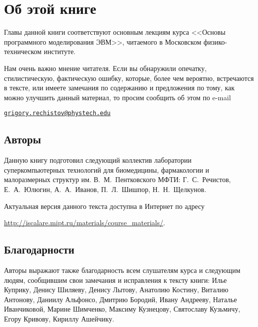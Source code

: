 \chapter*{Об этой книге}\label{chap:contrib}

Главы данной книги соответствуют основным лекциям курса <<Основы программного моделирования ЭВМ>>, читаемого в Московском физико-техническом институте.

Нам очень важно мнение читателя. Если вы обнаружили опечатку, стилистическую, фактическую ошибку, которые, более чем вероятно, встречаются в тексте, или имеете замечания по содержанию и предложения по тому, как можно улучшить данный материал, то просим сообщить об этом по e-mail 

\begin{center}
\href{mailto:grigory.rechistov@phystech.edu}{\texttt{grigory.rechistov@phystech.edu}}
\end{center}


\section*{Авторы}

Данную книгу подготовил следующий коллектив лаборатории суперкомпьютерных технологий для биомедицины, фармакологии и малоразмерных структур им. В.~М.~Пентковского МФТИ: Г.~С.~Речистов, Е.~А.~Юлюгин, А.~А.~Иванов, П.~Л.~Шишпор, Н.~Н.~Щелкунов.

Актуальная версия данного текста доступна в Интернет по адресу

\url{http://iscalare.mipt.ru/materials/course_materials/}.

\section*{Благодарности}

Авторы выражают также благодарность всем слушателям курса и следующим людям, сообщившим свои замечания и исправления к тексту книги: Илье Куприку, Денису Шиляеву, Денису Лытову, Анатолию Костину, Виталию Антонову, Даниилу Альфонсо, Дмитрию Бородий, Ивану Андрееву, Наталье Иванчиковой, Марине Шимченко, Максиму Кузнецову, Святославу Кузьмичу, Егору Кривову, Кириллу Ашейчику.


